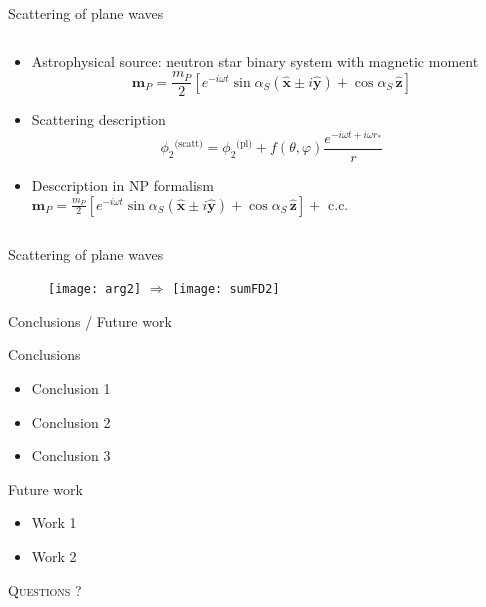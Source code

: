 \documentclass[9pt]{beamer}
\begin{document}
{
\begin{frame}[fragile]{Scattering of plane waves}
	\begin{columns}[T,onlytextwidth]        
		\begin{column}{0.60\textwidth}
			\begin{itemize}
				\item Astrophysical source: neutron star binary system with magnetic moment
				$$ \mathbf{m}_P = \frac{m_P}{2} \left[ e^{-i \omega t} \sin\alpha_S ( \mathbf{\hat{x}} \pm i \mathbf{\hat{y}}) + \cos\alpha_S \,\mathbf{\hat{z}} \right] $$

				\item Scattering description 
				$$ \phi_2{}^\text{(scatt)} =  \phi_2{}^\text{(pl)} + f(\theta,\varphi) \frac{e^{- i\omega t + i\omega r_*}}{r} $$

				\item Desccription in NP formalism 
				$ \mathbf{m}_P = \frac{m_P}{2} \left[ e^{-i \omega t} \sin\alpha_S ( \mathbf{\hat{x}} \pm i \mathbf{\hat{y}}) + \cos\alpha_S \,\mathbf{\hat{z}} \right] + \text{ c.c.} $
			\end{itemize}
		\end{column}
	\end{columns}
\end{frame}
}

\begin{frame}{Scattering of plane waves}
	\begin{figure}
		\texttt{[image: arg2]}
		$\Longrightarrow$
		\texttt{[image: sumFD2]}
	\end{figure}
\end{frame}

\begin{frame}{Conclusions / Future work}
	\begin{block}{Conclusions}
		\begin{itemize}
			\item Conclusion 1
			\item Conclusion 2
			\item Conclusion 3
		\end{itemize}
	\end{block}
	\begin{block}{Future work}
		\begin{itemize}
			\item Work 1
			\item Work 2
		\end{itemize}
	\end{block}
\end{frame}

\begin{frame}[standout]
	\huge\textsc{ Questions ? }
\end{frame}
\end{document}
